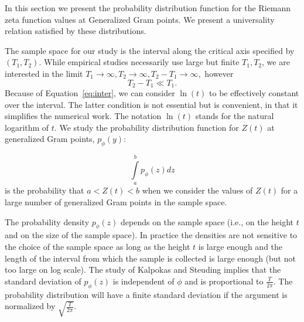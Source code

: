 \documentclass[twoside]{article}
\begin{document}
In this section we present the probability distribution function for the Riemann zeta function
values at Generalized Gram points. We present a universality relation satisfied by these distributions.

The sample space for our study is the interval along the critical axis specified by $(T_1, T_2)$. 
While empirical studies necessarily use large but finite  $T_1, T_2$, we are interested in the limit 
$T_1 \rightarrow \infty, T_2 \rightarrow \infty,  T_2-T_1 \rightarrow \infty,$ however
\begin{equation}
T_2 - T_1  \ll T_1. 
\label{eq:inter}
\end{equation}
Because of Equation~\ref{eq:inter}, we can consider  $\ln (t)$  to be effectively constant over  the interval.
The latter condition is not essential but is convenient, in that it simplifies the numerical work. 
The notation $\ln (t)$ stands for the natural logarithm of $t$.  
We study the probability distribution function for $Z(t)$ at generalized Gram  points,
 $p_{\phi}(y)$:
\begin{definition}\label{pphi}
\begin{equation}
\int\limits_{a}^{b} p_{\phi}(z)dz
\label{eq:pdfphi}
\end{equation}
is the probability that $a<Z(t)<b$ when we consider the values of $Z(t)$ for a large number of 
generalized Gram points in the sample space. 
\end{definition}
The probability density  $p_{\phi}(z)$ depends on the sample space (i.e., on the height $t$ and on the size of 
the sample space). In practice the densities are not sensitive to the choice of the sample space as long as 
the height $t$ is large enough and the length of the interval from which the sample is collected is large enough 
(but not too large on log scale). The  study of 
Kalpokas and Steuding \cite{kalpokas 2009} implies that the standard deviation of $p_{\phi}(z)$  
is independent of $\phi$ and is proportional to $\frac{T}{2\pi}$.  
The probability distribution will have a finite standard deviation if the 
argument is normalized by $\sqrt{\frac{T}{2\pi}}$.
\end{document}
